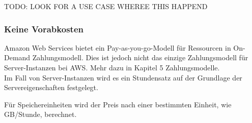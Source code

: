 TODO: LOOK FOR A USE CASE WHEREE THIS HAPPEND

\subsubsection{Keine Vorabkosten}
Amazon Web Services bietet ein Pay-as-you-go-Modell für Ressourcen in On-Demand Zahlungsmodell.
Dies ist jedoch nicht das einzige Zahlungsmodell für Server-Instanzen bei AWS. Mehr dazu in Kapitel 5 Zahlungsmodelle.
\\
Im Fall von Server-Instanzen wird es ein Stundensatz auf der Grundlage \newline der Servereigenschaften festgelegt.

Für Speichereinheiten wird der Preis nach einer bestimmten Einheit, wie GB/Stunde, berechnet.

\begin{comment}
Advantages of Cloud Technology
As the technology has matured over the last decade, companies are moving to the
cloud to lower costs, reduce complexity, and increase flexibility. The cloud
provides scalable and powerful compute solutions, low-cost, reliable storage, and addition, cloud technologies can be used to deploy solutions quickly and cost effectively around the world and on any device.
When you decouple from the data center, you’ll be able to:
x Decrease your TCO: Eliminate many of the costs related to building and
maintaining a data center or colocation deployment. Pay for only the
resources you consume.

x Reduce complexity: Reduce the need to manage infrastructure,
investigate licensing issues, or divert resources.
x Adjust capacity on the fly: Add or reduce resources, depending on
seasonal business needs, using infrastructure that is secure, reliable, and
broadly accessible.
x Reduce time to market: Design and develop new IT projects faster.
x Deploy quickly, even worldwide: Deploy applications across multiple
geographic areas.
x Increase efficiencies: Use automation to reduce or eliminate IT
management activities that waste time and resources.
x Innovate more: Spin up a new server and try out an idea. Each project
moves through the funnel more quickly because the cloud makes it faster
(and cheaper) to deploy, test, and launch new products and services.
x Spend your resources strategically: Switch to a DevOps model to free
your IT staff from operations and maintenance that can be handled by the
cloud services provider.
x Enhance security: Spend less time conducting security reviews on
infrastructure. Mature cloud providers have teams of people who focus on
security, offering best practices to ensure you’re compliant, no matter what
your industry.
\end{comment}

